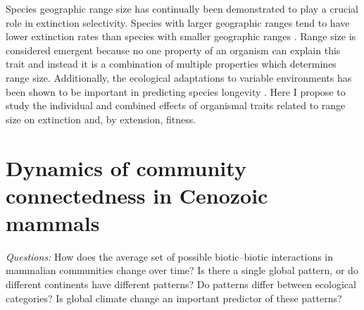 \documentclass[12pt,letterpaper]{article}
\begin{document}


Species geographic range size has continually been demonstrated to play a crucial role in extinction selectivity. Species with larger geographic ranges tend to have lower extinction rates than species with smaller geographic ranges \citep{Jablonski1986,Harnik2013,Nurnberg2013a,Jablonski2003,Roy2009c}. Range size is considered emergent because no one property of an organism can explain this trait and instead it is a combination of multiple properties which determines range size. Additionally, the ecological adaptations to variable environments has been shown to be important in predicting species longevity \citep{Foote2013,Liow2007b}. Here I propose to study the individual and combined effects of organismal traits related to range size on extinction and, by extension, fitness. 


\section{Dynamics of community connectedness in Cenozoic mammals}

\textit{Questions:} 
How does the average set of possible biotic--biotic interactions in mammalian communities change over time? Is there a single global pattern, or do different continents have different patterns? Do patterns differ between ecological categories? Is global climate change an important predictor of these patterns?
\end{document}

